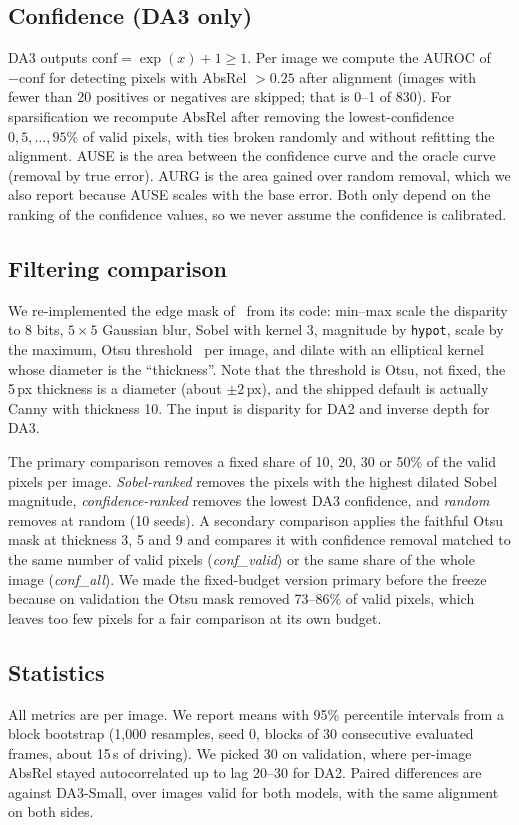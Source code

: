 \documentclass[conference]{IEEEtran}
\newcommand{\absrel}{AbsRel}
\begin{document}
\subsection{Confidence (DA3 only)}
DA3 outputs $\mathrm{conf}=\exp(x)+1\ge1$. Per image we compute the AUROC of $-\mathrm{conf}$ for detecting pixels with \absrel{} $>0.25$ after alignment (images with fewer than 20 positives or negatives are skipped; that is 0--1 of 830). For sparsification we recompute \absrel{} after removing the lowest-confidence $0,5,\dots,95\%$ of valid pixels, with ties broken randomly and without refitting the alignment. AUSE is the area between the confidence curve and the oracle curve (removal by true error). AURG is the area gained over random removal, which we also report because AUSE scales with the base error. Both only depend on the ranking of the confidence values, so we never assume the confidence is calibrated.

\subsection{Filtering comparison}\label{sec:filterproto}
We re-implemented the edge mask of~\cite{offroadnav} from its code: min--max scale the disparity to 8 bits, $5\times5$ Gaussian blur, Sobel with kernel 3, magnitude by \texttt{hypot}, scale by the maximum, Otsu threshold~\cite{otsu} per image, and dilate with an elliptical kernel whose diameter is the ``thickness''. Note that the threshold is Otsu, not fixed, the 5\,px thickness is a diameter (about $\pm2$\,px), and the shipped default is actually Canny with thickness 10. The input is disparity for DA2 and inverse depth for DA3.

The primary comparison removes a fixed share of 10, 20, 30 or 50\% of the valid pixels per image. \emph{Sobel-ranked} removes the pixels with the highest dilated Sobel magnitude, \emph{confidence-ranked} removes the lowest DA3 confidence, and \emph{random} removes at random (10 seeds). A secondary comparison applies the faithful Otsu mask at thickness 3, 5 and 9 and compares it with confidence removal matched to the same number of valid pixels (\emph{conf\_valid}) or the same share of the whole image (\emph{conf\_all}). We made the fixed-budget version primary before the freeze because on validation the Otsu mask removed 73--86\% of valid pixels, which leaves too few pixels for a fair comparison at its own budget.

\subsection{Statistics}
All metrics are per image. We report means with 95\% percentile intervals from a block bootstrap (1{,}000 resamples, seed 0, blocks of 30 consecutive evaluated frames, about 15\,s of driving). We picked 30 on validation, where per-image \absrel{} stayed autocorrelated up to lag 20--30 for DA2. Paired differences are against DA3-Small, over images valid for both models, with the same alignment on both sides.
\end{document}
